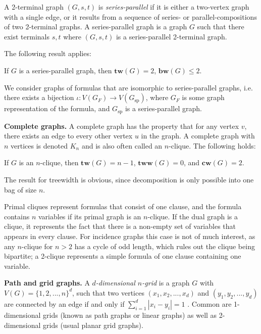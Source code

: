 A 2-terminal graph $(G, s, t)$ is {\em series-parallel} if it is either a two-vertex graph with a single edge,
or it results from a sequence of series- or parallel-compositions of two 2-terminal graphs.
A series-parallel graph is a graph $G$ such that there exist terminals $s, t$ where $(G, s, t)$ is a series-parallel 2-terminal graph.

The following result applies:

\begin{fact}
	If $G$ is a series-parallel graph, then $\mathbf{tw}(G) = 2$, $\mathbf{bw}(G) \leq 2$. 
\end{fact}

\noindent
We consider graphs of formulas that are isomorphic to series-parallel graphs, i.e. there exists a bijection $\iota : V(G_F) \rightarrow V(G_{\text{sp}})$, where $G_F$ is some graph representation of the formula, and $G_{\text{sp}}$ is a series-parallel graph.

\textbf{Complete graphs.}
A complete graph has the property that for any vertex $v$, there exists an edge to every other vertex $u$ in the graph.
A complete graph with $n$ vertices is denoted $K_n$ and is also often called an $n$-clique.
The following holds:
\begin{fact}
	If $G$ is an $n$-clique, then $\mathbf{tw}(G) = n - 1$, $\mathbf{tww}(G) = 0$, and $\mathbf{cw}(G) = 2$.
\end{fact}

\noindent
The result for treewidth is obvious, since decomposition is only possible into one bag of size $n$.

{\color{lightgray} Primal cliques represent formulas that consist of one clause, and the formula contains $n$ variables if its primal graph is an $n$-clique.
If the dual graph is a clique, it represents the fact that there is a non-empty set of variables that appears in every clause.
For incidence graphs this case is not of much interest, as any $n$-clique for $n > 2$ has a cycle of odd length, which rules out the clique being bipartite; a 2-clique represents a simple formula of one clause containing one variable.}

\textbf{Path and grid graphs.}
A {\em $d$-dimensional $n$-grid} is a graph $G$ with $V(G) = \{1, 2, ..., n\}^d$, such that two vertices $(x_1, x_2, ..., x_d)$ and $(y_1, y_2, ..., y_d)$ are connected by an edge if and only if $\sum_{i=1}^d |x_i - y_i| = 1$ \cite{DBLP:conf/focs/Bonnet0TW20}.
Common are 1-dimensional grids (known as path graphs or linear graphs) as well as 2-dimensional grids (usual planar grid graphs).

